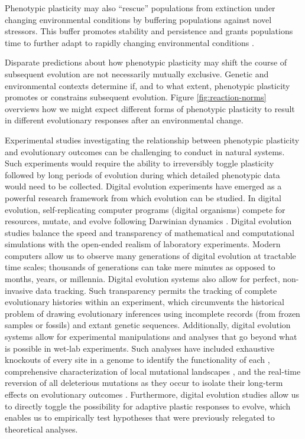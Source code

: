 Phenotypic plasticity may also ``rescue'' populations from extinction under changing environmental conditions by buffering populations against novel stressors.
This buffer promotes stability and persistence and grants populations time to further adapt to rapidly changing environmental conditions \citep{west-eberhard_developmental_2003,chevin_when_2010}.

Disparate predictions about how phenotypic plasticity may shift the course of subsequent evolution are not necessarily mutually exclusive.
Genetic and environmental contexts determine if, and to what extent, phenotypic plasticity promotes or constrains subsequent evolution.
Figure \ref{fig:reaction-norms} overviews how we might expect different forms of phenotypic plasticity to result in different evolutionary responses after an environmental change.

Experimental studies investigating the relationship between phenotypic plasticity and evolutionary outcomes can be challenging to conduct in natural systems.
Such experiments would require the ability to irreversibly toggle plasticity followed by long periods of evolution during which detailed phenotypic data would need to be collected.
Digital evolution experiments have emerged as a powerful research framework from which evolution can be studied.
In digital evolution, self-replicating computer programs (digital organisms) compete for resources, mutate, and evolve following Darwinian dynamics  \citep{wilke_biology_2002}.
Digital evolution studies balance the speed and transparency of mathematical and computational simulations with the open-ended realism of laboratory experiments.
Modern computers allow us to observe many generations of digital evolution at tractable time scales; thousands of generations can take mere minutes as opposed to months, years, or millennia.
Digital evolution systems also allow for perfect, non-invasive data tracking.
Such transparency permits the tracking of complete evolutionary histories within an experiment, which circumvents the historical problem of drawing evolutionary inferences using incomplete records (from frozen samples or fossils) and extant genetic sequences.
Additionally, digital evolution systems allow for experimental manipulations and analyses that go beyond what is possible in wet-lab experiments.
Such analyses have included exhaustive knockouts of every site in a genome to identify the functionality of each \citep{lenski_evolutionary_2003},
comprehensive characterization of local mutational landscapes \citep{lenski_genome_1999,canino-koning_fluctuating_2019},
and the real-time reversion of all deleterious mutations as they occur to isolate their long-term effects on evolutionary outcomes \citep{covert_experiments_2013}.
Furthermore, digital evolution studies allow us to directly toggle the possibility for adaptive plastic responses to evolve, which enables us to empirically test hypotheses that were previously relegated to theoretical analyses.

